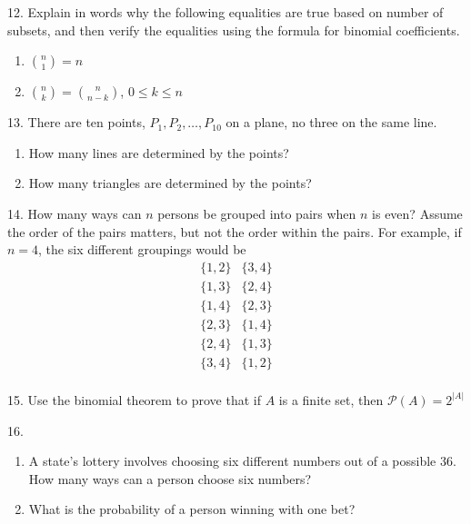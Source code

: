 \documentclass[10pt,]{book}
\theoremstyle{plain}
\theoremstyle{definition}
\begin{document}
\hypertarget{exercisegroup-18}{}\begin{exercisegroup}
\item[12.]\hypertarget{exercise-95}{} Explain in words why the following equalities are true based on number of subsets,  and then verify the equalities using the formula for binomial coefficients.
\leavevmode%
\begin{enumerate}[label=(\alph*)]
\item\hypertarget{li-242}{}\(\binom{n}{1} = n\) \item\hypertarget{li-243}{}\(\binom{n}{k} = \binom{n}{n-k}\), \( 0 \leq k \leq n\)\end{enumerate}
\par\smallskip
\item[13.]\hypertarget{exercise-96}{}  There are ten points, \(P_1, P_2, \dots , P_{10}\) on a plane, no three on the same line.%
\leavevmode%
\begin{enumerate}[label=(\alph*)]
\item\hypertarget{li-244}{}How many lines are determined by the points?\item\hypertarget{li-245}{} How many triangles are determined by the points?\end{enumerate}
\par\smallskip
\item[14.]\hypertarget{exercise-97}{} How many ways can \(n\)  persons be grouped into pairs when \(n\)  is even? Assume the order of the pairs matters, but not the order within the pairs. For example, if \(n=4\), the six different groupings would be
\[\begin{array}{cc}
 \{1,2\} & \{3,4\} \\
 \{1,3\} & \{2,4\} \\
 \{1,4\} & \{2,3\} \\
 \{2,3\} & \{1,4\} \\
 \{2,4\} & \{1,3\} \\
 \{3,4\} & \{1,2\} \\
\end{array}
\]\par\smallskip
\item[15.]\hypertarget{exercise-98}{} Use the binomial theorem to prove that if \(A\) is a finite set, then 
\(\mathscr{P}(A) = 2^{\lvert A \rvert}\)\par\smallskip
\item[16.]\hypertarget{exercise-99}{}\leavevmode%
\begin{enumerate}[label=(\alph*)]
\item\hypertarget{li-246}{}A state's lottery involves choosing six different numbers out of a possible 36. How many ways can a person choose six numbers?\item\hypertarget{li-247}{}What is the probability of a person winning with one bet?\end{enumerate}

\end{exercisegroup}
\end{document}
